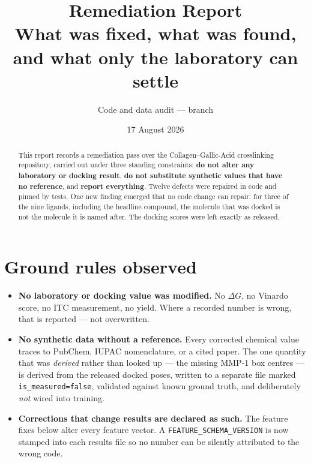 \documentclass[11pt,a4paper]{article}
\title{Remediation Report\\
\large What was fixed, what was found, and what only the laboratory can settle}
\author{Code and data audit --- branch \code{north-review}}
\date{17 August 2026}
\newcommand{\code}[1]{\texttt{\small #1}}
\begin{document}
\maketitle

\begin{abstract}
\noindent
This report records a remediation pass over the Collagen--Gallic-Acid
crosslinking repository, carried out under three standing constraints:
\textbf{do not alter any laboratory or docking result}, \textbf{do not
substitute synthetic values that have no reference}, and \textbf{report
everything}. Twelve defects were repaired in code and pinned by tests. One new
finding emerged that no code change can repair: for three of the nine ligands,
including the headline compound, the molecule that was docked is not the
molecule it is named after. The docking scores were left exactly as released.
\end{abstract}

\section{Ground rules observed}

\begin{itemize}\itemsep2pt
  \item \textbf{No laboratory or docking value was modified.} No
        $\Delta G$, no Vinardo score, no ITC measurement, no yield. Where a
        recorded number is wrong, that is reported --- not overwritten.
  \item \textbf{No synthetic data without a reference.} Every corrected
        chemical value traces to PubChem, IUPAC nomenclature, or a cited
        paper. The one quantity that was \emph{derived} rather than looked up
        --- the missing MMP-1 box centres --- is derived from the released
        docked poses, written to a separate file marked
        \code{is\_measured=false}, validated against known ground truth, and
        deliberately \emph{not} wired into training.
  \item \textbf{Corrections that change results are declared as such.} The
        feature fixes below alter every feature vector. A
        \code{FEATURE\_SCHEMA\_VERSION} is now stamped into each results file
        so no number can be silently attributed to the wrong code.
\end{itemize}
\end{document}
